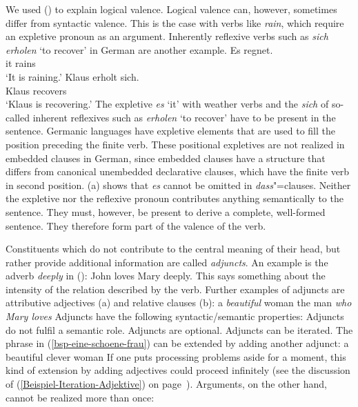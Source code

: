 We used () to explain logical valence. Logical valence can, however, sometimes differ from syntactic
valence. This is the case with verbs like \emph{rain}, which
require an expletive pronoun as an argument. 
Inherently reflexive verbs
such as \emph{sich erholen} `to recover' in German are another example. %
\eal
\ex\label{Beispiel-es-regnet}
\gll Es regnet.\\
     it rains\\
\glt `It is raining.'
\ex\label{Beispiel-erholt-sich}
\gll Klaus erholt sich.\\
     Klaus recovers \\
\glt `Klaus is recovering.'
\zl
The expletive \emph{es} `it' with weather verbs and the \emph{sich} of so-called inherent reflexives such as \emph{erholen} `to recover' have to
be present in the sentence. Germanic languages have expletive elements that are used to fill the
position preceding the finite verb. These positional expletives are not realized in embedded clauses in
German, since embedded clauses have a structure that differs from canonical unembedded declarative
clauses, which have the finite verb in second position. (a) shows that \emph{es} cannot
be omitted in \emph{dass}"=clauses.
\eal
{}
\zl
Neither the expletive nor the reflexive pronoun contributes anything semantically to the sentence. They must, however, be present to derive a complete,
well-formed sentence. They therefore form part of the valence of the verb.



Constituents which do not contribute to the central meaning of their head, but rather provide additional information are called \emph{adjuncts}.
An example is the adverb \emph{deeply} in ():
\ea
John loves Mary deeply.
\z
This says something about the intensity of the relation described by the verb. Further examples of
adjuncts are attributive adjectives (a) and relative clauses (b):
\eal
\ex\label{bsp-eine-schoene-frau}
a {\em beautiful\/} woman
\ex the man {\em who Mary loves\/}
\zl
Adjuncts have the following syntactic/semantic properties:
\eal
\label{adj-kriterien}
\ex Adjuncts do not fulfil a semantic role.
\ex Adjuncts are optional.
\ex Adjuncts can be iterated.
\zl
The phrase in (\ref{bsp-eine-schoene-frau}) can be extended by adding another adjunct:
\ea
a beautiful clever woman
\z
If one puts processing problems aside for a moment, this kind of extension by adding adjectives could proceed infinitely
(see the discussion of (\ref{Beispiel-Iteration-Adjektive}) on page~\pageref{Beispiel-Iteration-Adjektive}). Arguments, on the other hand, cannot be realized
more than once:
\z


